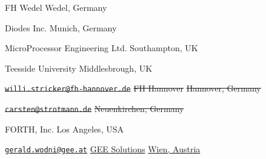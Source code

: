 	{}
	{FH Wedel}
	{Wedel, Germany}

	{}
	{Diodes Inc.}
	{Munich, Germany}

	{}
	{MicroProcessor Engineering Ltd.}
	{Southampton, UK}

	{}
	{Teesside University}
	{Middlesbrough, UK}

\cbstart
{}
	{\sout{\texttt{willi.stricker@fh-hannover.de}}}
	{\sout{FH Hannover}}
	{\sout{Hannover, Germany}}
\cbend

\cbstart
{}
	{\sout{\texttt{carsten@strotmann.de}}}
	{}
	{\sout{Neuenkirchen, Germany}}
\cbend

	{}
	{FORTH, Inc.}
	{Los Angeles, USA}

\cbstart
{}
	{\uline{\texttt{gerald.wodni@gee.at}}}
	{\uline{GEE Solutions}}
	{\uline{Wien, Austria}}
\cbend

